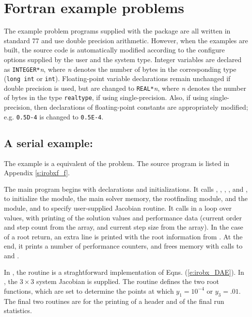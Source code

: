 \section{Fortran example problems}\label{s:ex_fortran}

The {\F} example problem programs supplied with the {\ida}
package are all written in standard {\F}77 and use double precision
arithmetic. However, when the {\F} examples are built, the source code is
automatically modified according to the configure options supplied by the
user and the system type. Integer variables are declared as {\tt INTEGER*}{\em n},
where {\em n} denotes the number of bytes in the corresponding {\C} type
({\tt long int} or {\tt int}). Floating-point variable declarations remain
unchanged if double precision is used, but are changed to {\tt REAL*}{\em n},
where {\em n} denotes the number of bytes in the {\sundials} type {\tt realtype},
if using single-precision. Also, if using single-precision, then declarations of
floating-point constants are appropriately modified; e.g. {\tt 0.5D-4} is
changed to {\tt 0.5E-4}.


\subsection{A serial example: }\label{ss:irobxf}

The  example is a {\F} equivalent of the  problem.
The source program  is listed in Appendix \ref{s:irobxf_f}.

The main program begins with declarations and initializations.  It calls 
, , , , and
, to initialize the {\nvecs} module, the main
solver memory, the rootfinding module, and the {\idadense} module, and
to specify user-supplied Jacobian routine.
It calls  in a loop over  values, with printing of
the solution values and performance data (current order and step count
from the  array, and current step size from the  array).
In the case of a root return, an extra line is printed with the root
information from .  At the end, it prints a number of
performance counters, and frees memory with calls to 
and .

In , the  routine is a straghtforward
implementation of Eqns. (\ref{e:irobx_DAE}).  In , the 
$3 \times 3$ system Jacobian is supplied.  The  routine
defines the two root functions, which are set to determine the points at which
$y_1 = 10^{-4}$ or $y_3 = .01$.  The final two routines are for the
printing of a header and of the final run statistics.

